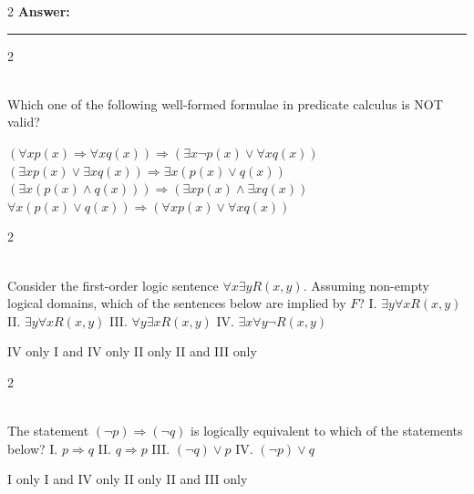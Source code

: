 \documentclass[12pt]{exam}
\begin{document}
\begin{questions}
\begin{multicols*}{2}
\vspace{0.5cm}
\textbf{Answer:} \rule{3cm}{0.4pt}

\end{multicols*}
\vspace{0.6cm}
\newpage
\begin{multicols*}{2}

 \\[0.2cm]
{\Large Which one of the following well-formed formulae in predicate calculus is NOT valid?}
\begin{choices}
  \choice $(\forall x p(x) \Rightarrow \forall x q(x)) \Rightarrow (\exists x \neg p(x) \vee \forall x q(x))$
  \choice $(\exists x p(x) \vee \exists x q(x)) \Rightarrow \exists x (p(x) \vee q(x))$
  \choice $(\exists x (p(x) \wedge q(x))) \Rightarrow (\exists x p(x) \wedge \exists x q(x))$
  \choice $\forall x (p(x) \vee q(x)) \Rightarrow (\forall x p(x) \vee \forall x q(x))$
\end{choices}

\end{multicols*}
\vspace{0.6cm}
\newpage
\begin{multicols*}{2}

 \\[0.2cm]
{\Large Consider the first-order logic sentence $\forall x \exists y R(x,y)$. Assuming non-empty logical domains, which of the sentences below are implied by $F$?\newline
I. $\exists y \forall x R(x,y)$\newline
II. $\exists y \forall x R(x,y)$\newline
III. $\forall y \exists x R(x,y)$\newline
IV. $\exists x \forall y \neg R(x,y)$}
\begin{choices}
  \choice IV only
  \choice I and IV only
  \choice II only
  \choice II and III only
\end{choices}

\end{multicols*}
\vspace{0.6cm}
\newpage
\begin{multicols*}{2}

 \\[0.2cm]
{\Large The statement $(\neg p) \Rightarrow (\neg q)$ is logically equivalent to which of the statements below?\newline
I. $p \Rightarrow q$\newline
II. $q \Rightarrow p$\newline
III. $(\neg q) \vee p$\newline
IV. $(\neg p) \vee q$}
\begin{choices}
  \choice I only
  \choice I and IV only
  \choice II only
  \choice II and III only
\end{choices}


\end{multicols*}
\end{questions}
\end{document}

